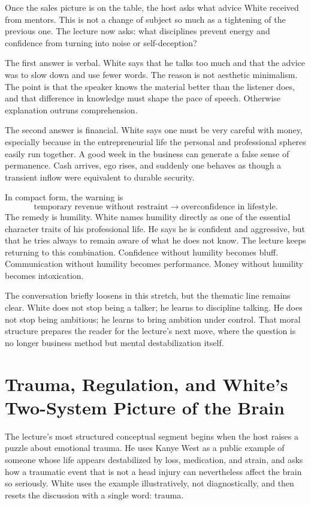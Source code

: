 Once the sales picture is on the table, the host asks what advice White received from mentors. This is not a change of subject so much as a tightening of the previous one. The lecture now asks: what disciplines prevent energy and confidence from turning into noise or self-deception?

The first answer is verbal. White says that he talks too much and that the advice was to slow down and use fewer words. The reason is not aesthetic minimalism. The point is that the speaker knows the material better than the listener does, and that difference in knowledge must shape the pace of speech. Otherwise explanation outruns comprehension.

The second answer is financial. White says one must be very careful with money, especially because in the entrepreneurial life the personal and professional spheres easily run together. A good week in the business can generate a false sense of permanence. Cash arrives, ego rises, and suddenly one behaves as though a transient inflow were equivalent to durable security.

In compact form, the warning is
\begin{equation}
\text{temporary revenue without restraint}
\to
\text{overconfidence in lifestyle}.
\end{equation}
The remedy is humility. White names humility directly as one of the essential character traits of his professional life. He says he is confident and aggressive, but that he tries always to remain aware of what he does not know. The lecture keeps returning to this combination. Confidence without humility becomes bluff. Communication without humility becomes performance. Money without humility becomes intoxication.

The conversation briefly loosens in this stretch, but the thematic line remains clear. White does not stop being a talker; he learns to discipline talking. He does not stop being ambitious; he learns to bring ambition under control. That moral structure prepares the reader for the lecture's next move, where the question is no longer business method but mental destabilization itself.

\section{Trauma, Regulation, and White's Two-System Picture of the Brain}

The lecture's most structured conceptual segment begins when the host raises a puzzle about emotional trauma. He uses Kanye West as a public example of someone whose life appears destabilized by loss, medication, and strain, and asks how a traumatic event that is not a head injury can nevertheless affect the brain so seriously. White uses the example illustratively, not diagnostically, and then resets the discussion with a single word: trauma.

